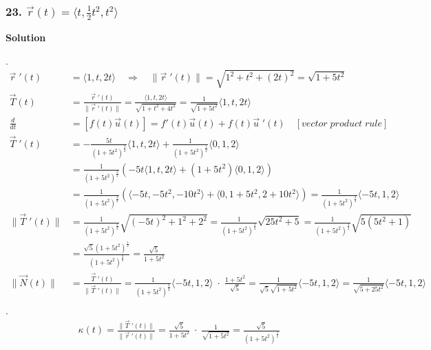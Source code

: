 \documentclass{article}
\newcommand{\drvec}{\vec{r}\;'(t)}
\newcommand\rr{\quad\Rightarrow\quad}
\begin{document}
\subsubsection*{23. $\vec{r}(t) = \langle{t, \frac{1}{2}t^2, t^2} \rangle$}
\centerline{\textbf{Solution}}
. 
\begin{align*}
    \drvec &= \langle 1, t, 2t \rangle \rr \|\drvec\| = \sqrt{1^2 + t^2 + (2t)^2} = \sqrt{1 + 5t^2} \\ 
    \vec T(t) &= \frac{\drvec}{\|\drvec\|} = \frac{\langle 1, t, 2t \rangle}{\sqrt{1 + t^2 + 4t^2}} = \frac{1}{\sqrt{1 + 5t^2}}\langle 1, t, 2t \rangle \\
    \frac{d}{dt} &= [f(t)\vec u (t)] = f'(t)\vec u (t) + f(t)\vec u \;'(t) \quad [vector\;product\;rule] \\  
    \vec T\;'(t) &= -\frac{5t}{(1+5t^2)^{\frac 3 2}}\langle 1, t, 2t\rangle + \frac{1}{(1+5t^2)^\frac 1 2}\langle 0, 1, 2 \rangle \\
                 &= \frac{1}{(1+5t^2)^{\frac 3 2}}\left(-5t \langle 1, t, 2t \rangle + (1+5t^2)\langle 0, 1, 2 \rangle\right) \\
                 &= \frac{1}{(1+5t^2)^{\frac 3 2}}\left(\langle -5t, -5t^2, -10t^2 \rangle + \langle 0, 1+5t^2, 2+10t^2 \rangle\right) = \frac{1}{(1+5t^2)^{\frac 3 2}} \langle -5t, 1, 2 \rangle \\
    \|\vec T\;'(t)\| &= \frac{1}{(1+5t^2)^{\frac 3 2}}\sqrt{(-5t)^2 + 1^2 + 2^2} = \frac{1}{(1+5t^2)^{\frac 3 2}}\sqrt{25t^2 + 5} = \frac{1}{(1+5t^2)^{\frac 3 2}}\sqrt{5(5t^2 + 1)} \\
                     &= \frac{\sqrt 5 (1+5t^2)^{\frac 1 2}}{(1+5t^2)^{\frac 3 2}} = \frac{\sqrt 5}{1+5t^2} \\
    \|\vec N(t)\| &=  \frac{\vec T\;'(t)}{\|\vec T\;'(t)\|} = \frac{1}{(1+5t^2)^{\frac 3 2}} \langle -5t, 1, 2 \rangle \; \cdot \; \frac{1+5t^2}{\sqrt 5} = \frac{1}{\sqrt 5\sqrt{1+5t^2}} \langle -5t, 1, 2 \rangle  = \frac{1}{\sqrt{5+25t^2}}\langle -5t, 1, 2 \rangle\\ 
\end{align*}
.
\begin{align*}
    \kappa(t) = \frac{\|\vec T\;'(t)\|}{\|\drvec\|} = \frac{\sqrt 5}{1+5t^2} \; \cdot \; \frac{1}{\sqrt{1+5t^2}} = \frac{\sqrt 5}{(1+5t^2)^{\frac 3 2}}
\end{align*}
\end{document}
